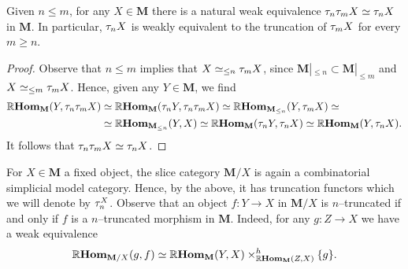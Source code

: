 \begin{corollary}
  Given \(n \leq m\), for any \(X\in\mathbf M\) there is a natural weak
  equivalence \(\tau_{n}\tau_{m} X \simeq \tau_{n} X\) in \(\mathbf M\). In
  particular, \(\tau_{n}X\) is weakly equivalent to the  truncation of
  \(\tau_{m}X\) for every \(m\geq n\).
\end{corollary}
\begin{proof}
  Observe that \(n\leq m\) implies that \(X \simeq_{\leq n}\tau_{m}X\), since
  \(\mathbf M|_{\leq n}\subset \mathbf M|_{\leq m}\) and \(X\simeq_{\leq
    m}\tau_{m}X\). Hence, given any \(Y\in\mathbf M\), we find
  \begin{align*}
    \operatorname{\mathbb{R}\textnormal{\bfseries Hom}}_{\mathbf M}(Y, \tau_{n}\tau_{m} X)&\simeq \operatorname{\mathbb{R}\textnormal{\bfseries Hom}}_{\mathbf M}(\tau_{n}Y, \tau_{n}\tau_{m}X)\simeq \operatorname{\mathbb{R}\textnormal{\bfseries Hom}}_{\mathbf M_{\leq n}}(Y, \tau_{m}X)\simeq \\
                                              &\simeq \operatorname{\mathbb{R}\textnormal{\bfseries Hom}}_{\mathbf M_{\leq n}}(Y, X) \simeq \operatorname{\mathbb{R}\textnormal{\bfseries Hom}}_{\mathbf M}(\tau_{n}Y, \tau_{n}X)\simeq \operatorname{\mathbb{R}\textnormal{\bfseries Hom}}_{\mathbf M}(Y, \tau_{n}X).
  \end{align*}
  It follows that \(\tau_{n}\tau_{m}X\simeq \tau_{n}X\).
\end{proof}

For \(X\in\mathbf{M}\) a fixed object, the slice category \(\mathbf M/X\) is
again a combinatorial simplicial model category. Hence, by the above, it has
truncation functors which we will denote by \(\tau_{n}^{X}\). Observe that an
object \(f\colon Y\to X\) in \(\mathbf M/X\) is \(n\)--truncated if and only if
\(f\) is a \(n\)--truncated morphism in \(\mathbf M\). Indeed, for any \(g\colon
Z\to X\) we have a weak equivalence
\[
  \operatorname{\mathbb{R}\textnormal{\bfseries Hom}}_{\mathbf M/X}(g, f)\simeq \operatorname{\mathbb{R}\textnormal{\bfseries Hom}}_{\mathbf M}(Y,
  X)\times^{h}_{\operatorname{\mathbb{R}\textnormal{\bfseries Hom}}_{\mathbf M}(Z, X)} \{g\}.
\]

